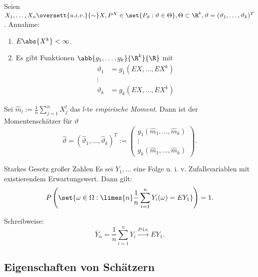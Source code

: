 \begin{karte}{}
    Seien \(X_1, \ldots, X_n \oversett{u.i.v.}{\sim} X, P^X \in \set{P_\vartheta : \vartheta \in \Theta}, \Theta \subset \R^k, \vartheta = (\vartheta_1, \ldots, \vartheta_k)^T\).
    Annahme: 
    \begin{enumerate}
        \item \(E \abs{X^k} < \infty\).
        \item Es gibt Funktionen \(\abb{g_1, \ldots, g_k}{\R^k}{\R}\) mit 
        \begin{align*}
            \vartheta_1 &= g_1(E X, \ldots, E X^k) \\
            \vdots \\
            \vartheta_k &= g_k(E X, \ldots, E X^k)
        \end{align*}
    \end{enumerate}

    Sei \(\hat{m}_l := \frac{1}{n} \sum_{j=1}^n X_j^l\) das \(l\)-te \textit{empirische Moment}.
    Dann ist der Momentenschätzer für \(\vartheta\)
    \[ \hat{\vartheta} = (\hat{\vartheta}_1, \ldots, \hat{\vartheta}_k)^T := \begin{pmatrix}
        g_1(\hat{m}_1, \ldots, \hat{m}_k) \\ \vdots \\ g_k(\hat{m}_1, \ldots, \hat{m}_k)
    \end{pmatrix}. \]
\end{karte}

\begin{karte}{Starkes Gesetz großer Zahlen}
    Es sei \(Y_1, \ldots\) eine Folge u. i. v. Zufallsvariablen mit existierendem Erwartungswert. Dann gilt:
    \[ P\left( \set{ \omega \in \Omega: \limes{n} \frac{1}{n} \sum_{i=1}^n Y_i(\omega) = E Y_1 } \right) = 1. \]

    Schreibweise: 
    \[ \bar{Y}_n = \frac{1}{n} \sum_{i=1}^n Y_i \overset{P\text{-f.s.}}{\rightarrow} E Y_1. \]
\end{karte}

\subsection{Eigenschaften von Schätzern}

